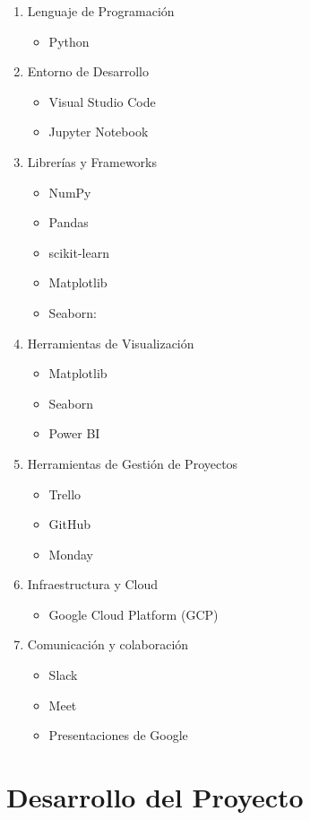 \documentclass{other/docTemplate}
\begin{document}
\begin{enumerate}
  \item Lenguaje de Programación
  \begin{itemize}
    \item Python
  \end{itemize}
  \item Entorno de Desarrollo
  \begin{itemize}
    \item Visual Studio Code 
    \item Jupyter Notebook
  \end{itemize}
  \item Librerías y Frameworks
  \begin{itemize}
    \item NumPy
    \item Pandas
    \item scikit-learn
    \item Matplotlib
    \item Seaborn:
  \end{itemize}
  \item Herramientas de Visualización
  \begin{itemize}
   \item Matplotlib
   \item Seaborn
   \item Power BI
  \end{itemize}
  \item Herramientas de Gestión de Proyectos
  \begin{itemize}
   \item Trello
   \item GitHub
   \item Monday
  \end{itemize}
  \item Infraestructura y Cloud
  \begin{itemize}
    \item Google Cloud Platform (GCP)
  \end{itemize}
  \item Comunicación y colaboración
  \begin{itemize}
    \item Slack
    \item Meet
    \item Presentaciones de Google
  \end{itemize}
\end{enumerate}


\clearpage
\section{Desarrollo del Proyecto} 
\end{document}
